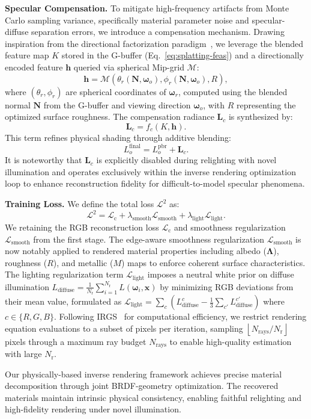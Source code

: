 \noindent\textbf{Specular Compensation.}
To mitigate high-frequency artifacts from Monte Carlo sampling variance, specifically material parameter noise and specular-diffuse separation errors, we introduce a compensation mechanism. Drawing inspiration from the directional factorization paradigm~\cite{zhang2025refgs}, 
we leverage the blended feature map $K$ stored in the G-buffer (Eq.~\ref{eq:splatting-feas}) and a directionally encoded feature $\boldsymbol{h}$ queried via spherical Mip-grid $\mathcal{M}$:
\begin{equation}
\boldsymbol{h} = \mathcal{M}\left( \theta_r(\boldsymbol{N}, \boldsymbol{\omega}_o), \phi_r(\boldsymbol{N}, \boldsymbol{\omega}_o), R \right),
\end{equation}
where $(\theta_r, \phi_r)$ are spherical coordinates of $\boldsymbol{\omega}_r$, computed using the blended normal $\boldsymbol{N}$ from the G-buffer and viewing direction $\boldsymbol{\omega}_o$, with $R$ representing the optimized surface roughness.
The compensation radiance $\boldsymbol{L}_c$ is synthesized by:
\begin{equation}
\boldsymbol{L}_c = f_c \left( K, \boldsymbol{h} \right).
\end{equation}
This term refines physical shading through additive blending:
\begin{equation}
L_o^{\mathrm{final}} = L_o^{\mathrm{pbr}} + \boldsymbol{L}_c.
\end{equation}
It is noteworthy that $\boldsymbol{L}_c$ is explicitly disabled during relighting with novel illumination and operates exclusively within the inverse rendering optimization loop to enhance reconstruction fidelity for difficult-to-model specular phenomena.

\noindent\textbf{Training Loss.}
We define the total loss $\mathcal{L}^2$ as:
\begin{equation}
\mathcal{L}^2 = \mathcal{L}_{\mathrm{c}} + \lambda_{\text{smooth}} \mathcal{L}_{\text{smooth}} + \lambda_{\text{light}} \mathcal{L}_{\text{light}}.
\end{equation}
We retaining the RGB reconstruction loss $\mathcal{L}_{\mathrm{c}}$ and smoothness regularization $\mathcal{L}_{\text{smooth}}$ from the first stage. The edge-aware smoothness regularization $\mathcal{L}_{\text{smooth}}$ is now notably applied to rendered material properties including albedo ($\boldsymbol{\Lambda}$), roughness ($R$), and metallic ($M$) maps to enforce coherent surface characteristics. The lighting regularization term $\mathcal{L}_{\text{light}}$ imposes a neutral white prior on diffuse illumination $L_{\text{diffuse}} = \frac{1}{N_{\mathrm{r}}} \sum_{i=1}^{N_{\mathrm{r}}} L\left(\boldsymbol{\omega}_i, \boldsymbol{x}\right)$ by minimizing RGB deviations from their mean value, formulated as $\mathcal{L}_{\text{light}} = \sum_c \left( L_{\text{diffuse}}^c - \frac{1}{3} \sum_{c'} L_{\text{diffuse}}^{c'} \right)$ where $c \in \{R, G, B\}$. Following IRGS~\cite{gu2025irgs} for computational efficiency, we restrict rendering equation evaluations to a subset of pixels per iteration, sampling $\left\lfloor N_{\text{rays}} / N_{\mathrm{r}} \right\rfloor$ pixels through a maximum ray budget $N_{\text{rays}}$ to enable high-quality estimation with large $N_{\mathrm{r}}$.

Our physically-based inverse rendering framework achieves precise material decomposition through joint BRDF-geometry optimization. The recovered materials maintain intrinsic physical consistency, enabling faithful relighting and high-fidelity rendering under novel illumination.